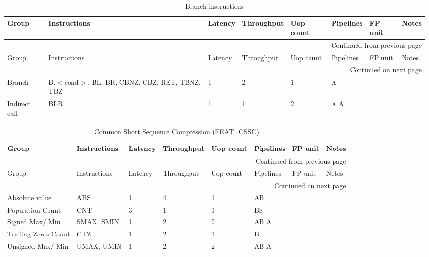 \begin{longtable}{|p{1in}|p{1in}|l|l|l|p{1in}|l|p{1in}|}
\caption{Branch instructions} \\
\hline
Group & Instructions & Latency & Throughput & Uop count & Pipelines & FP unit & Notes\\
\hline
\endfirsthead
\hline
\multicolumn{8}{|r|}{{\tablename\ \thetable{} -- Continued from previous page}} \\
\hline
Group & Instructions & Latency & Throughput & Uop count & Pipelines & FP unit & Notes\\
\hline
\endhead
\hline
\multicolumn{8}{|r|}{{Continued on next page}} \\
\hline
\endfoot
\hline
\endlastfoot
Branch & B.$<$cond$>$, BL, BR, CBNZ, CBZ, RET, TBNZ, TBZ & 1 & 2 & 1 & A &  & \\
\hline
Indirect call & BLR & 1 & 1 & 2 & A A &  & \\
\hline
\end{longtable}
\begin{longtable}{|p{1in}|p{1in}|l|l|l|p{1in}|l|p{1in}|}
\caption{Common Short Sequence Compression (FEAT\_CSSC)} \\
\hline
Group & Instructions & Latency & Throughput & Uop count & Pipelines & FP unit & Notes\\
\hline
\endfirsthead
\hline
\multicolumn{8}{|r|}{{\tablename\ \thetable{} -- Continued from previous page}} \\
\hline
Group & Instructions & Latency & Throughput & Uop count & Pipelines & FP unit & Notes\\
\hline
\endhead
\hline
\multicolumn{8}{|r|}{{Continued on next page}} \\
\hline
\endfoot
\hline
\endlastfoot
Absolute value & ABS & 1 & 4 & 1 & AB &  & \\
\hline
Population Count & CNT & 3 & 1 & 1 & BS &  & \\
\hline
Signed Max/ Min & SMAX, SMIN & 1 & 2 & 2 & AB A &  & \\
\hline
Trailing Zeros Count & CTZ & 1 & 2 & 1 & B &  & \\
\hline
Unsigned Max/ Min & UMAX, UMIN & 1 & 2 & 2 & AB A &  & \\
\hline
\end{longtable}
